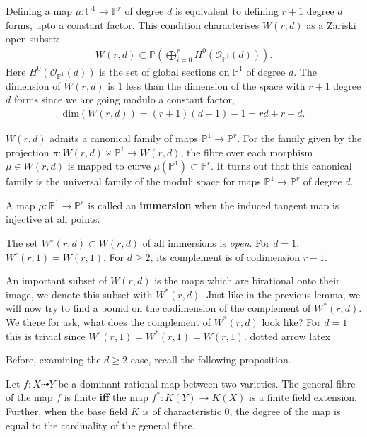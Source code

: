 \par Defining a map $\mu : \mathbb{P}^{1} \to \mathbb{P}^{r}$ of degree $d$ is equivalent to defining $r+1$ degree $d$ forms, upto a constant factor.
This condition characterises $W(r,d)$ as a Zariski open subset:
\begin{align*}
    W(r,d) \subset \mathbb{P}\left(\bigoplus_{i=0}^{r}H^{0}(\mathcal{O}_{\mathbb{P}^{1}}(d)) \right).
\end{align*}
Here $H^{0}(\mathcal{O}_{\mathbb{P}^{1}}(d))$ is the set of global sections on $\mathbb{P}^{1}$ of degree $d$.
The dimension of $W(r,d)$ is $1$ less than the dimension of the space with $r+1$ degree $d$ forms since we are going modulo a constant factor, 
\begin{align*}
    \text{dim}(W(r,d)) = (r+1)(d+1) - 1 = rd + r + d.
\end{align*}
\par $W(r,d)$ admits a canonical family of maps $\mathbb{P}^{1} \to \mathbb{P}^{r}$.
For the family given by the projection $\pi : W(r,d) \times \mathbb{P}^{1} \to W(r,d)$, the fibre over each morphism $\mu \in W(r,d)$ is mapped to curve $\mu(\mathbb{P}^{1}) \subset \mathbb{P}^{r}$.
It turns out that this canonical family is the universal family of the moduli space for maps $\mathbb{P}^{1} \to \mathbb{P}^{r}$ of degree $d$.
\begin{definition}
    A map $\mu :\mathbb{P}^{1} \to \mathbb{P}^{r}$ is called an \textbf{immersion} when the induced tangent map is injective at all points.
\end{definition}
\begin{lemma}
    The set $W^{\circ}(r,d) \subset W(r,d)$ of all immersions is \textit{open}.
    For $d=1$, $W^{\circ}(r,1)  = W(r,1)$. For $d\geq 2$, its complement is of codimension $r-1$.
\end{lemma}


An important subset of $W(r,d)$ is the maps which are birational onto their image, we denote this subset with $W^{*}(r,d)$.
Just like in the previous lemma, we will now try to find a bound on the codimension of the complement of $W^{*}(r,d)$. 
We there for ask, what does the complement of $W^{*}(r,d)$ look like?
For $d=1$ this is trivial since $W^{\circ}(r,1) = W^{*}(r,1) =  W(r,1)$.
dotted arrow latex
\par Before, examining the $d \geq 2$ case, recall the following proposition.
\begin{proposition}
    Let $f: X \dashrightarrow Y$ be a dominant rational map between two varieties. 
    The general fibre of the map $f$ is finite \textbf{iff} the map $f^{*}: K(Y) \to K(X)$ is a finite field extension.
    Further, when the base field $K$ is of characteristic $0$, the degree of the map is equal to the cardinality of the general fibre.
\end{proposition}

